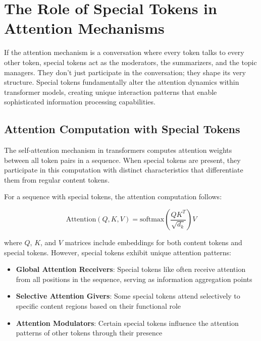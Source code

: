 \section{The Role of Special Tokens in Attention Mechanisms}

If the attention mechanism is a conversation where every token talks to every other token, special tokens act as the moderators, the summarizers, and the topic managers. They don't just participate in the conversation; they shape its very structure. Special tokens fundamentally alter the attention dynamics within transformer models, creating unique interaction patterns that enable sophisticated information processing capabilities.
\begin{comment}
Feedback: This is a strong opening. To make it even more engaging, you could use a metaphor. For example: "If the attention mechanism is a conversation where every token talks to every other token, special tokens act as the moderators, the summarizers, and the topic managers. They don't just participate in the conversation; they shape its very structure."

STATUS: addressed - added conversational metaphor to make the opening more engaging
\end{comment}

\subsection{Attention Computation with Special Tokens}

The self-attention mechanism in transformers computes attention weights between all token pairs in a sequence. When special tokens are present, they participate in this computation with distinct characteristics that differentiate them from regular content tokens.

For a sequence with special tokens, the attention computation follows:

\begin{equation}
\text{Attention}(Q, K, V) = \text{softmax}\left(\frac{QK^T}{\sqrt{d_k}}\right)V
\end{equation}

where $Q$, $K$, and $V$ matrices include embeddings for both content tokens and special tokens. However, special tokens exhibit unique attention patterns:

\begin{itemize}
\item \textbf{Global Attention Receivers}: Special tokens like \cls{} often receive attention from all positions in the sequence, serving as information aggregation points
\item \textbf{Selective Attention Givers}: Some special tokens attend selectively to specific content regions based on their functional role
\item \textbf{Attention Modulators}: Certain special tokens influence the attention patterns of other tokens through their presence
\end{itemize}

